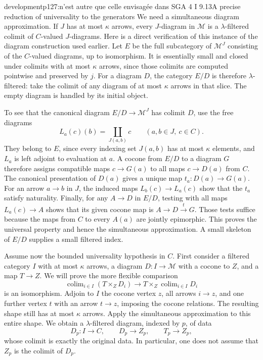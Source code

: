 \begin{dcomment}{development}{p127:n'est autre que celle envisagée dans SGA 4 I 9.13}{A precise reduction of universality to the generators}
We need a simultaneous diagram approximation. If $J$ has at most $\kappa$ arrows, every $J$-diagram in $\mathcal M$ is a $\lambda$-filtered colimit of $C$-valued $J$-diagrams. Here is a direct verification of this instance of the diagram construction used earlier. Let $E$ be the full subcategory of $\mathcal M^J$ consisting of the $C$-valued diagrams, up to isomorphism. It is essentially small and closed under colimits with at most $\kappa$ arrows, since those colimits are computed pointwise and preserved by $j$. For a diagram $D$, the category $E/D$ is therefore $\lambda$-filtered: take the colimit of any diagram of at most $\kappa$ arrows in that slice. The empty diagram is handled by its initial object.

To see that the canonical diagram $E/D\to\mathcal M^J$ has colimit $D$, use the free diagrams
\[
 L_a(c)(b)=\coprod_{J(a,b)}c
 \qquad(a,b\in J,\ c\in C).
\]
They belong to $E$, since every indexing set $J(a,b)$ has at most $\kappa$ elements, and $L_a$ is left adjoint to evaluation at $a$. A cocone from $E/D$ to a diagram $G$ therefore assigns compatible maps $c\to G(a)$ to all maps $c\to D(a)$ from $C$. The canonical presentation of $D(a)$ gives a unique map $t_a:D(a)\to G(a)$. For an arrow $a\to b$ in $J$, the induced maps $L_b(c)\to L_a(c)$ show that the $t_a$ satisfy naturality. Finally, for any $A\to D$ in $E/D$, testing with all maps $L_a(c)\to A$ shows that its given cocone map is $A\to D\xrightarrow{t}G$. Those tests suffice because the maps from $C$ to every $A(a)$ are jointly epimorphic. This proves the universal property and hence the simultaneous approximation. A small skeleton of $E/D$ supplies a small filtered index.

Assume now the bounded universality hypothesis in $C$. First consider a filtered category $I$ with at most $\kappa$ arrows, a diagram $D:I\to\mathcal M$ with a cocone to $Z$, and a map $T\to Z$. We will prove the more flexible comparison
\[
 \operatorname{colim}_{i\in I}(T\times_Z D_i)
   \longrightarrow T\times_Z\operatorname{colim}_{i\in I}D_i
 \tag{*}
\]
is an isomorphism. Adjoin to $I$ the cocone vertex $z$, all arrows $i\to z$, and one further vertex $t$ with an arrow $t\to z$, imposing the cocone relations. The resulting shape still has at most $\kappa$ arrows. Apply the simultaneous approximation to this entire shape. We obtain a $\lambda$-filtered diagram, indexed by $p$, of data
\[
 D_p:I\to C,\qquad D_p\longrightarrow Z_p,
 \qquad T_p\longrightarrow Z_p,
\]
whose colimit is exactly the original data. In particular, one does not assume that $Z_p$ is the colimit of $D_p$.


\end{dcomment}
